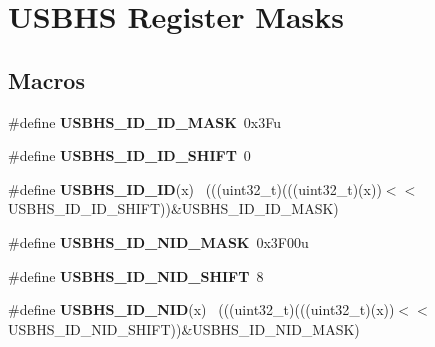 \hypertarget{group___u_s_b_h_s___register___masks}{}\section{U\+S\+B\+H\+S Register Masks}
\label{group___u_s_b_h_s___register___masks}
\subsection*{Macros}
\begin{DoxyCompactItemize}
\item 
\hypertarget{group___u_s_b_h_s___register___masks_ga4f76ab44439c1a067c692c3b7d611712}{}\#define {\bfseries U\+S\+B\+H\+S\+\_\+\+I\+D\+\_\+\+I\+D\+\_\+\+M\+A\+S\+K}~0x3\+Fu\label{group___u_s_b_h_s___register___masks_ga4f76ab44439c1a067c692c3b7d611712}

\item 
\hypertarget{group___u_s_b_h_s___register___masks_ga66bb30bdb296f6687725c96f733063d4}{}\#define {\bfseries U\+S\+B\+H\+S\+\_\+\+I\+D\+\_\+\+I\+D\+\_\+\+S\+H\+I\+F\+T}~0\label{group___u_s_b_h_s___register___masks_ga66bb30bdb296f6687725c96f733063d4}

\item 
\hypertarget{group___u_s_b_h_s___register___masks_gabb76ffe317f11c70b5d08d7601a44e3e}{}\#define {\bfseries U\+S\+B\+H\+S\+\_\+\+I\+D\+\_\+\+I\+D}(x)                                                  ~(((uint32\+\_\+t)(((uint32\+\_\+t)(x))$<$$<$U\+S\+B\+H\+S\+\_\+\+I\+D\+\_\+\+I\+D\+\_\+\+S\+H\+I\+F\+T))\&U\+S\+B\+H\+S\+\_\+\+I\+D\+\_\+\+I\+D\+\_\+\+M\+A\+S\+K)\label{group___u_s_b_h_s___register___masks_gabb76ffe317f11c70b5d08d7601a44e3e}

\item 
\hypertarget{group___u_s_b_h_s___register___masks_gae230ac94c244a72c845f8bc6bf515110}{}\#define {\bfseries U\+S\+B\+H\+S\+\_\+\+I\+D\+\_\+\+N\+I\+D\+\_\+\+M\+A\+S\+K}~0x3\+F00u\label{group___u_s_b_h_s___register___masks_gae230ac94c244a72c845f8bc6bf515110}

\item 
\hypertarget{group___u_s_b_h_s___register___masks_gad31becadd792c9fbdd359e90dec31cfe}{}\#define {\bfseries U\+S\+B\+H\+S\+\_\+\+I\+D\+\_\+\+N\+I\+D\+\_\+\+S\+H\+I\+F\+T}~8\label{group___u_s_b_h_s___register___masks_gad31becadd792c9fbdd359e90dec31cfe}

\item 
\hypertarget{group___u_s_b_h_s___register___masks_gafa3e29060b37674b18c66ed5149df0ec}{}\#define {\bfseries U\+S\+B\+H\+S\+\_\+\+I\+D\+\_\+\+N\+I\+D}(x)                                                ~(((uint32\+\_\+t)(((uint32\+\_\+t)(x))$<$$<$U\+S\+B\+H\+S\+\_\+\+I\+D\+\_\+\+N\+I\+D\+\_\+\+S\+H\+I\+F\+T))\&U\+S\+B\+H\+S\+\_\+\+I\+D\+\_\+\+N\+I\+D\+\_\+\+M\+A\+S\+K)\label{group___u_s_b_h_s___register___masks_gafa3e29060b37674b18c66ed5149df0ec}


\end{DoxyCompactItemize}
